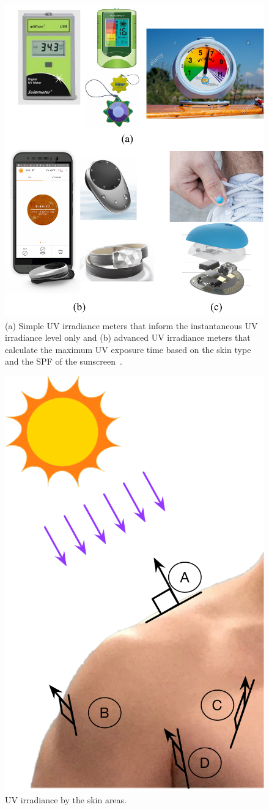 \documentclass[journal]{IEEEtran}
\begin{document}
\begin{figure}
\centering
\includegraphics[width=0.8\hsize]{Figures/UVI_meter.pdf}
\caption{(a) Simple UV irradiance meters that inform the instantaneous UV irradiance level only and (b) advanced UV irradiance meters that calculate the maximum UV exposure time based on the skin type and the SPF of the sunscreen~\cite{Netatmo, Ultra, LOreal}.}
\label{fig:UVI_meters}
\end{figure}

\begin{figure}
\centering
\includegraphics[width=0.4\hsize]{Figures/UV_skin_areas.pdf}
\caption{UV irradiance by the skin areas.}
\label{fig:UV_exposure_skin}
\end{figure}
\end{document}
